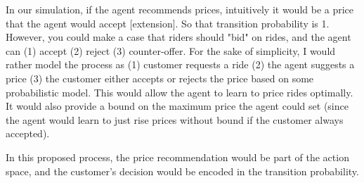 \documentclass[12pt]{article}
\begin{document}
In our simulation, if the agent recommends prices, intuitively it would be a price that the agent
would accept [extension]. So that transition probability is 1. However, you could make a case that riders
should "bid" on rides, and the agent can (1) accept (2) reject (3) counter-offer. For the sake
of simplicity, I would rather model the process as (1) customer requests a ride (2) the agent
suggests a price (3) the customer either accepts or rejects the price based on some
probabilistic model. This would allow the agent to learn to price rides optimally. It would also
provide a bound on the maximum price the agent could set (since the agent would learn to just rise
prices without bound if the customer always accepted).

In this proposed process, the price recommendation would be part of the action space, and the
customer's decision would be encoded in the transition probability.
\end{document}
